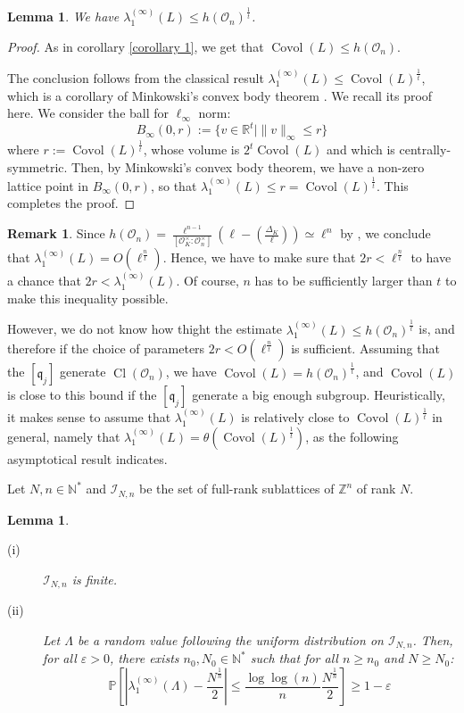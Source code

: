 \documentclass[a4paper,10pt]{report}
\theoremstyle{definition}
\theoremstyle{plain}
\newtheorem{lemma}[definition]{Lemma}
\theoremstyle{definition}
\newtheorem{remark}[definition]{Remark}
\newcommand{\N}{\mathbb{N}}
\newcommand{\Z}{\mathbb{Z}}
\newcommand{\R}{\mathbb{R}}
\newcommand{\m}[1]{\mathcal{#1}}
\newcommand{\mO}{\mathcal{O}}
\renewcommand{\(}{\left(}
\renewcommand{\)}{\right)}
\renewcommand{\P}{\mathbb{P}}
\newcommand{\mf}[1]{\mathfrak{#1}}
\DeclareMathOperator{\Cl}{Cl}
\DeclareMathOperator{\Covol}{Covol}
\begin{document}
\begin{lemma}
We have $\lambda_1^{(\infty)}(L)\leq h(\mO_n)^{\frac{1}{t}}$.
\end{lemma}

\begin{proof}
As in corollary \ref{corollary 1}, we get that $\Covol(L)\leq h(\mO_n)$.

The conclusion follows from the classical result $\lambda_1^{(\infty)}(L)\leq \Covol(L)^{\frac{1}{t}}$, which is a corollary of Minkowski's convex body theorem \cite[theorem V.3]{Lang_ANT}. We recall its proof here. We consider the ball for $\ell_\infty$ norm:
\[B_\infty(0,r):=\{v\in\R^t\mid \|v\|_\infty\leq r\}\]
where $r:=\Covol(L)^{\frac{1}{t}}$, whose volume is $2^t\Covol(L)$ and which is centrally-symmetric. Then, by Minkowski's convex body theorem, we have a non-zero lattice point in $B_\infty(0,r)$, so that $\lambda_1^{(\infty)}(L)\leq r=\Covol(L)^{\frac{1}{t}}$. This completes the proof.
\end{proof}

\begin{remark}
Since $h(\mO_n)=\frac{\ell^{n-1}}{[\mO_K^\times:\mO_n^\times]}\(\ell-\(\frac{\Delta_K}{\ell}\)\)\simeq\ell^n$ by \cite[theorem 7.24]{Cox}, we conclude that $\lambda_1^{(\infty)}(L)=O(\ell^{\frac{n}{t}})$. Hence, we have to make sure that $2r<\ell^{\frac{n}{t}}$ to have a chance that $2r<\lambda_1^{(\infty)}(L)$.  Of course, $n$ has to be sufficiently larger than $t$ to make this inequality possible.

However, we do not know how thight the estimate $\lambda_1^{(\infty)}(L)\leq h(\mO_n)^{\frac{1}{t}}$ is, and therefore if the choice of parameters $2r<O(\ell^{\frac{n}{t}})$ is sufficient. Assuming that the $[\mf{q}_j]$ generate $\Cl(\mO_n)$, we have $\Covol(L)=h(\mO_n)^{\frac{1}{t}}$, and $\Covol(L)$ is close to this bound if the $[\mf{q}_j]$ generate a big enough subgroup. Heuristically, it makes sense to assume that $\lambda_1^{(\infty)}(L)$ is relatively close to $\Covol(L)^{\frac{1}{t}}$ in general, namely that $\lambda_1^{(\infty)}(L)=\theta(\Covol(L)^{\frac{1}{t}})$, as the following asymptotical result indicates. 
\end{remark}

Let $N, n\in\N^*$ and $\m{I}_{N,n}$ be the set of full-rank sublattices of $\Z^n$ of rank $N$.

\begin{lemma}
\begin{description}
\item[(i)] $\m{I}_{N,n}$ is finite.
\item[(ii)] Let $\Lambda$ be a random value following the uniform distribution on $\m{I}_{N,n}$. Then, for all $\varepsilon>0$, there exists $n_0, N_0\in\N^*$ such that for all $n\geq n_0$ and $N\geq N_0$:
\[\P\left[\left|\lambda_1^{(\infty)}(\Lambda)-\frac{N^{\frac{1}{n}}}{2}\right|\leq \frac{\log\log(n)}{n}\frac{N^{\frac{1}{n}}}{2}\right]\geq 1-\varepsilon\]
\end{description}
\end{lemma}
\end{document}
